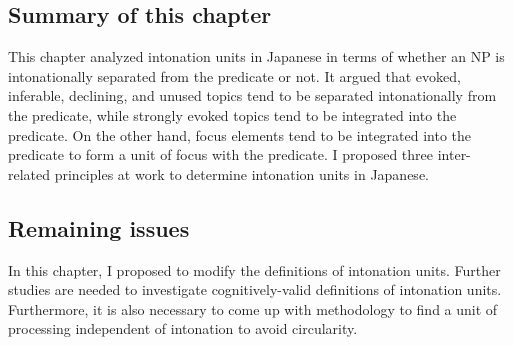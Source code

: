 \subsection{Summary of this chapter}


This chapter analyzed intonation units in Japanese
in terms of whether an NP is intonationally separated from the predicate or not.
It argued that evoked, inferable, declining, and unused topics tend to be separated intonationally from the predicate,
while strongly evoked topics tend to be integrated into the predicate.
On the other hand,
focus elements tend to be integrated into the predicate
to form a unit of focus with the predicate.
I proposed three inter-related principles at work to determine
intonation units in Japanese.



\subsection{Remaining issues}

In this chapter,
I proposed to modify the definitions of intonation units.
Further studies are needed to investigate cognitively-valid definitions of intonation units.
Furthermore, it is also necessary to come up with methodology to find a unit of processing independent of intonation
to avoid circularity.






